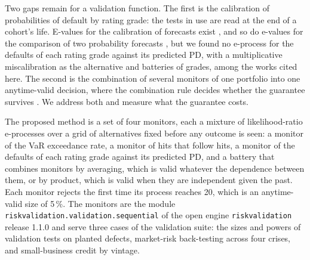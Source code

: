 Two gaps remain for a validation function. The first is the calibration of probabilities of default by rating grade: the tests in use are read at the end of a
cohort's life. E-values for the calibration of forecasts exist \citep{arnold2023}, and so do e-values for the comparison of two probability forecasts \citep{henzi2022}, but we found no e-process for the defaults of each rating grade against its predicted PD, with a multiplicative miscalibration as the alternative and batteries of grades, among the works cited here. The second is the combination of several monitors of one portfolio into one anytime-valid decision, where
the combination rule decides whether the guarantee survives \citep{vovk2021,ramdas2023}. We address both and measure what the guarantee costs.

The proposed method is a set of four monitors, each a mixture of likelihood-ratio e-processes over a grid of alternatives fixed before any outcome is seen: a monitor of the
VaR exceedance rate, a monitor of hits that follow hits, a monitor of the defaults of each rating grade against its predicted PD, and a battery that combines monitors by
averaging, which is valid whatever the dependence between them, or by product, which is valid when they are independent given the past. Each monitor rejects the first
time its process reaches 20, which is an anytime-valid size of 5\,\%. The monitors are the module \texttt{riskvalidation.validation.sequential} of the
open engine \texttt{riskvalidation} release 1.1.0 and serve three cases of the validation suite: the sizes and powers of validation tests on planted defects, market-risk
back-testing across four crises, and small-business credit by vintage.

